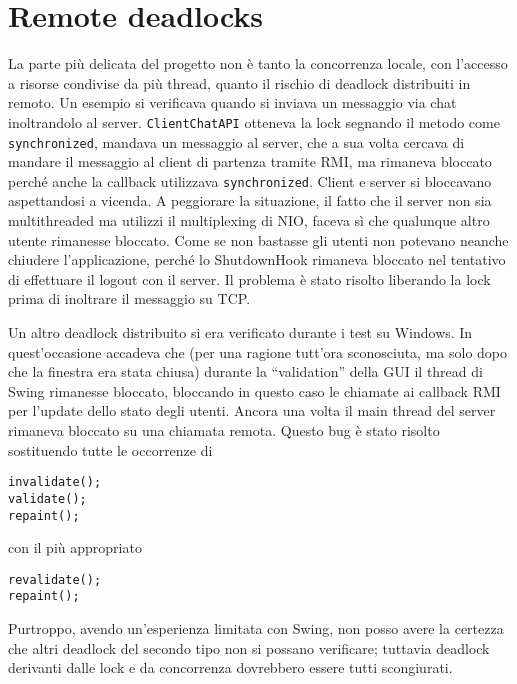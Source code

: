 \documentclass[a4paper,11pt] {article}
\begin{document}
\section*{Remote deadlocks}

La parte più delicata del progetto non è tanto la concorrenza locale, con l'accesso a risorse condivise da più thread, quanto il rischio di deadlock distribuiti in remoto. Un esempio si verificava quando si inviava un messaggio via chat inoltrandolo al server. \texttt{ClientChatAPI} otteneva la lock segnando il metodo come \texttt{synchronized}, mandava un messaggio al server, che a sua volta cercava di mandare il messaggio al client di partenza tramite RMI, ma rimaneva bloccato perché anche la callback utilizzava \texttt{synchronized}. Client e server si bloccavano aspettandosi a vicenda. A peggiorare la situazione, il fatto che il server non sia multithreaded ma utilizzi il multiplexing di NIO, faceva sì che qualunque altro utente rimanesse bloccato. Come se non bastasse gli utenti non potevano neanche chiudere l'applicazione, perché lo ShutdownHook rimaneva bloccato nel tentativo di effettuare il logout con il server. Il problema è stato risolto liberando la lock prima di inoltrare il messaggio su TCP.

Un altro deadlock distribuito si era verificato durante i test su Windows. In quest'occasione accadeva che (per una ragione tutt'ora sconosciuta, ma solo dopo che la finestra era stata chiusa) durante la ``validation'' della GUI il thread di Swing rimanesse bloccato, bloccando in questo caso le chiamate ai callback RMI per l'update dello stato degli utenti. Ancora una volta il main thread del server rimaneva bloccato su una chiamata remota. Questo bug è stato risolto sostituendo tutte le occorrenze di

\begin{verbatim}
invalidate();
validate();
repaint();
\end{verbatim}

con il più appropriato

\begin{verbatim}
revalidate();
repaint();
\end{verbatim}

Purtroppo, avendo un'esperienza limitata con Swing, non posso avere la certezza che altri deadlock del secondo tipo non si possano verificare; tuttavia deadlock derivanti dalle lock e da concorrenza dovrebbero essere tutti scongiurati.
\end{document}
